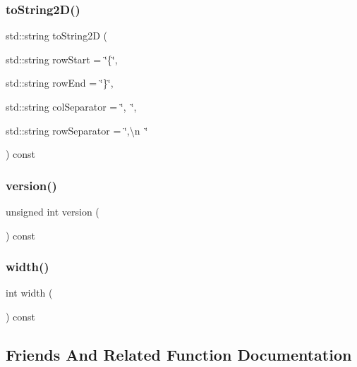 \mbox{\label{classGrid_a8e636ad8b56218c7e0162d6c1bd78b39}} 
\subsubsection{\texorpdfstring{to\+String2\+D()}{toString2D()}}
{\footnotesize\ttfamily std\+::string to\+String2D (\begin{DoxyParamCaption}\item[{std\+::string}]{row\+Start = {\ttfamily \char`\"{}\{\char`\"{}},  }\item[{std\+::string}]{row\+End = {\ttfamily \char`\"{}\}\char`\"{}},  }\item[{std\+::string}]{col\+Separator = {\ttfamily \char`\"{},~\char`\"{}},  }\item[{std\+::string}]{row\+Separator = {\ttfamily \char`\"{},\textbackslash{}n~\char`\"{}} }\end{DoxyParamCaption}) const}

\mbox{\label{classGrid_a0aa696ccb72cbf928535d6b646bac1aa}} 
\subsubsection{\texorpdfstring{version()}{version()}}
{\footnotesize\ttfamily unsigned int version (\begin{DoxyParamCaption}{ }\end{DoxyParamCaption}) const}

\mbox{\label{classGrid_ad72663daf610f2a0833a2fc3d78e4fdf}} 
\subsubsection{\texorpdfstring{width()}{width()}}
{\footnotesize\ttfamily int width (\begin{DoxyParamCaption}{ }\end{DoxyParamCaption}) const}



\subsection{Friends And Related Function Documentation}
\mbox{\label{classGrid_a20059dcdf5d8836488337c056079f5e2}} 
